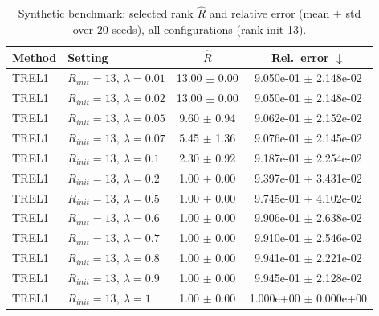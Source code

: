 \begin{table}[t]
\centering
\caption{Synthetic benchmark: selected rank \(\hat R\) and relative error (mean \(\pm\) std over \(20\) seeds), all configurations (rank init 13).}
\label{tab:results_synth_all}
\begin{tabular}{@{}llcc@{}}
\toprule
Method & Setting & \(\hat R\) & Rel.\ error \(\downarrow\) \\ \midrule
TREL1 & \(R_{init}=13,\ \lambda=0.01\) & 13.00 $\pm$ 0.00 & 9.050e-01 $\pm$ 2.148e-02 \\
TREL1 & \(R_{init}=13,\ \lambda=0.02\) & 13.00 $\pm$ 0.00 & 9.050e-01 $\pm$ 2.148e-02 \\
TREL1 & \(R_{init}=13,\ \lambda=0.05\) & 9.60 $\pm$ 0.94 & 9.062e-01 $\pm$ 2.152e-02 \\
TREL1 & \(R_{init}=13,\ \lambda=0.07\) & 5.45 $\pm$ 1.36 & 9.076e-01 $\pm$ 2.145e-02 \\
TREL1 & \(R_{init}=13,\ \lambda=0.1\) & 2.30 $\pm$ 0.92 & 9.187e-01 $\pm$ 2.254e-02 \\
TREL1 & \(R_{init}=13,\ \lambda=0.2\) & 1.00 $\pm$ 0.00 & 9.397e-01 $\pm$ 3.431e-02 \\
TREL1 & \(R_{init}=13,\ \lambda=0.5\) & 1.00 $\pm$ 0.00 & 9.745e-01 $\pm$ 4.102e-02 \\
TREL1 & \(R_{init}=13,\ \lambda=0.6\) & 1.00 $\pm$ 0.00 & 9.906e-01 $\pm$ 2.638e-02 \\
TREL1 & \(R_{init}=13,\ \lambda=0.7\) & 1.00 $\pm$ 0.00 & 9.910e-01 $\pm$ 2.546e-02 \\
TREL1 & \(R_{init}=13,\ \lambda=0.8\) & 1.00 $\pm$ 0.00 & 9.941e-01 $\pm$ 2.221e-02 \\
TREL1 & \(R_{init}=13,\ \lambda=0.9\) & 1.00 $\pm$ 0.00 & 9.945e-01 $\pm$ 2.128e-02 \\
TREL1 & \(R_{init}=13,\ \lambda=1\) & 1.00 $\pm$ 0.00 & 1.000e+00 $\pm$ 0.000e+00 \\
\bottomrule
\end{tabular}
\end{table}